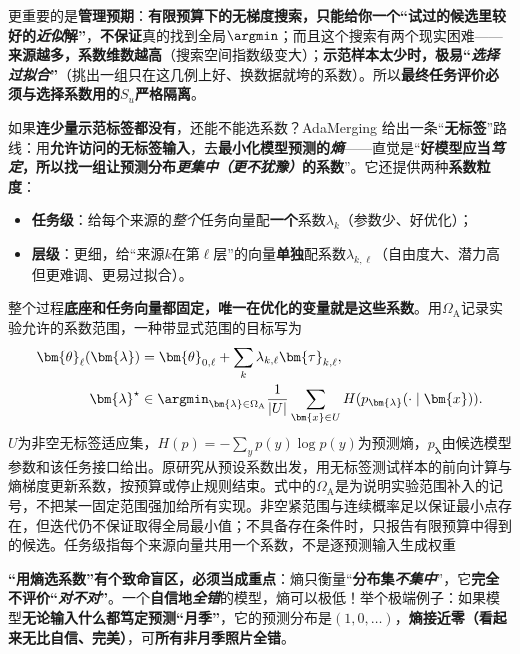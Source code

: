 更重要的是\textbf{管理预期}：\textbf{有限预算下的无梯度搜索，只能给你一个“试过的候选里较好的\emph{近似}解”}，\textbf{不保证}真的找到全局$\argmin$；而且这个搜索有两个现实困难——\textbf{来源越多，系数维数越高}（搜索空间指数级变大）；\textbf{示范样本太少时，极易“\emph{选择过拟合}”}（挑出一组只在这几例上好、换数据就垮的系数）。所以\textbf{最终任务评价必须与选择系数用的$S_u$严格隔离}。

如果\textbf{连少量示范标签都没有}，还能不能选系数？AdaMerging 给出一条“\textbf{无标签}”路线：用\textbf{允许访问的无标签输入}，去\textbf{最小化模型预测的\emph{熵}}——直觉是“\textbf{好模型应当\emph{笃定}，所以找一组让预测分布\emph{更集中（更不犹豫）}的系数}”。它还提供两种\textbf{系数粒度}：
\begin{itemize}\item \textbf{任务级}：给每个来源的\emph{整个}任务向量配\textbf{一个}系数$\lambda_k$（参数少、好优化）；\item \textbf{层级}：更细，给“来源$k$在第$\ell$层”的向量\textbf{单独}配系数$\lambda_{k,\ell}$（自由度大、潜力高但更难调、更易过拟合）。\end{itemize}
整个过程\textbf{底座和任务向量都固定，唯一在优化的变量就是这些系数}。用$\Omega_{\mathrm{A}}$记录实验允许的系数范围，一种带显式范围的目标写为
\begin{equation}
  \begin{aligned}
    \bm{\theta}_{\ell}(\bm{\lambda})
      &=\bm{\theta}_{0,\ell}+\sum_k\lambda_{k,\ell}\bm{\tau}_{k,\ell},\\
    \bm{\lambda}^{\star}
      &\in\argmin_{\bm{\lambda}\in\Omega_{\mathrm{A}}}\frac{1}{|U|}
        \sum_{\bm{x}\in U}H(p_{\bm{\lambda}}(\cdot\mid\bm{x})).
  \end{aligned}
  \label{eq:ket-integration-adamerging}
\end{equation}
$U$为非空无标签适应集，$H(p)=-\sum_y p(y)\log p(y)$为预测熵，$p_{\bm{\lambda}}$由候选模型参数和该任务接口给出。原研究从预设系数出发，用无标签测试样本的前向计算与熵梯度更新系数，按预算或停止规则结束。式中的$\Omega_{\mathrm{A}}$是为说明实验范围补入的记号，不把某一固定范围强加给所有实现。非空紧范围与连续概率足以保证最小点存在，但迭代仍不保证取得全局最小值；不具备存在条件时，只报告有限预算中得到的候选。任务级指每个来源向量共用一个系数，不是逐预测输入生成权重

\textbf{“用熵选系数”有个致命盲区，必须当成重点}：熵只衡量“\textbf{分布集\emph{不集中}}”，它\textbf{完全不评价“\emph{对不对}”}。一个\textbf{自信地\emph{全错}}的模型，熵可以极低！举个极端例子：如果模型\textbf{无论输入什么都笃定预测“月季”}，它的预测分布是$(1,0,\ldots)$，\textbf{熵接近零（看起来无比自信、完美）}，可\textbf{所有非月季照片全错}。

